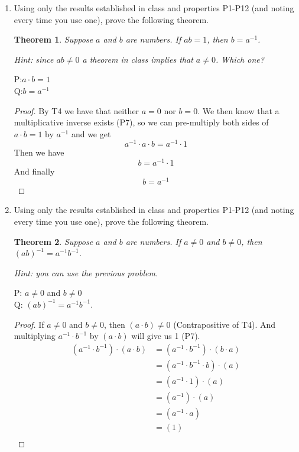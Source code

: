 \documentclass{article} %
\theoremstyle{plain}
\newtheorem*{theorem*}{Theorem}
\theoremstyle{case}
\begin{document}
\begin{enumerate}[label={\fbox{\textbf{Exercise \#\arabic* :}}}]
\newpage
\item Using only the results established in class and properties P1-P12
  (and noting every time you use one), prove the following theorem. 

\begin{theorem*}
Suppose $a$ and $b$ are numbers. If $ab=1$, then $b = a^{-1}$. 
\end{theorem*}
\textit{Hint: since $ab \neq 0$ a theorem in class implies that $a \neq 0$. Which one?}

P:$ a \cdot b = 1$ \\
Q:$ b = a ^{-1}$

\begin{proof}
  By T4 we have that neither $a=0$ nor $b=0$.  We then know that a
  multiplicative inverse exists (P7), so we can pre-multiply both sides
  of $a \cdot b = 1$ by $a ^{-1}$ and we get
    $$a ^{-1} \cdot a \cdot b = a ^{-1} \cdot 1$$
  Then we have
  \[ b = a ^{-1} \cdot 1 \tag*{(P7)} \]
  And finally
  \[ b = a ^{-1} \tag*{(P6)} \]
\end{proof} 

\newpage
\item Using only the results established in class and properties P1-P12 (and noting every time you use one), prove the following theorem. 

\begin{theorem*}
Suppose $a$ and $b$ are numbers. If $a \neq 0$ and $b \neq 0$, then $(a b)^{-1} = a^{-1} b^{-1}$. 
\end{theorem*}
\emph{Hint: you can use the previous problem.}

P: $a \neq 0$ and $b \neq 0$\\
Q: $(a b)^{-1} = a^{-1} b^{-1}$. 

\begin{proof}
If $a \neq 0$ and $b \neq 0$, then $(a \cdot b) \neq 0 $
(Contrapositive of T4).  And multiplying $a ^{-1} \cdot b ^{-1}$ by
$(a \cdot b)$ will give us 1 (P7).
  \begin{align*}
    (a ^{-1} \cdot b ^{-1} ) \cdot (a \cdot b) & = (a ^{-1} \cdot b ^{-1} ) \cdot (b \cdot a)\tag*{(P8)} \\
      & = (a ^{-1} \cdot b ^{-1} \cdot b ) \cdot (a)\tag*{(P5)} \\
      & = (a ^{-1} \cdot 1 ) \cdot (a)\tag*{(P7)} \\
      & = (a ^{-1} ) \cdot (a)\tag*{(P6)} \\
      & = (a ^{-1} \cdot a)\tag*{(P5)} \\
      & = (1)\tag*{(P7)} \\
  \end{align*}


\end{proof}
\end{enumerate}
\end{document}
